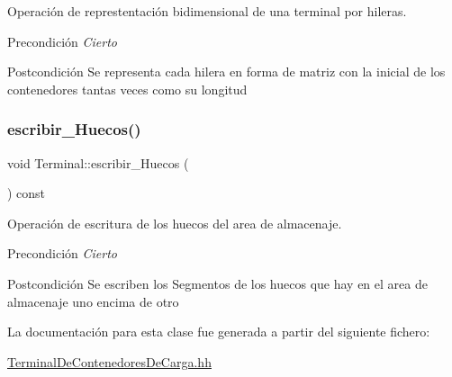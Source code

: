 Operación de represtentación bidimensional de una terminal por hileras. 

\begin{DoxyPrecond}{Precondición}
{\itshape Cierto} 
\end{DoxyPrecond}
\begin{DoxyPostcond}{Postcondición}
Se representa cada hilera en forma de matriz con la inicial de los contenedores tantas veces como su longitud 
\end{DoxyPostcond}
\mbox{\label{class_terminal_afbfd7c045961e20718f9b5ffa1a31aa1}} 
\subsubsection{\texorpdfstring{escribir\+\_\+\+Huecos()}{escribir\_Huecos()}}
{\footnotesize\ttfamily void Terminal\+::escribir\+\_\+\+Huecos (\begin{DoxyParamCaption}{ }\end{DoxyParamCaption}) const}



Operación de escritura de los huecos del area de almacenaje. 

\begin{DoxyPrecond}{Precondición}
{\itshape Cierto} 
\end{DoxyPrecond}
\begin{DoxyPostcond}{Postcondición}
Se escriben los Segmentos de los huecos que hay en el area de almacenaje uno encima de otro 
\end{DoxyPostcond}


La documentación para esta clase fue generada a partir del siguiente fichero\+:\begin{DoxyCompactItemize}
\item 
\hyperlink{_terminal_de_contenedores_de_carga_8hh}{Terminal\+De\+Contenedores\+De\+Carga.\+hh}\end{DoxyCompactItemize}
